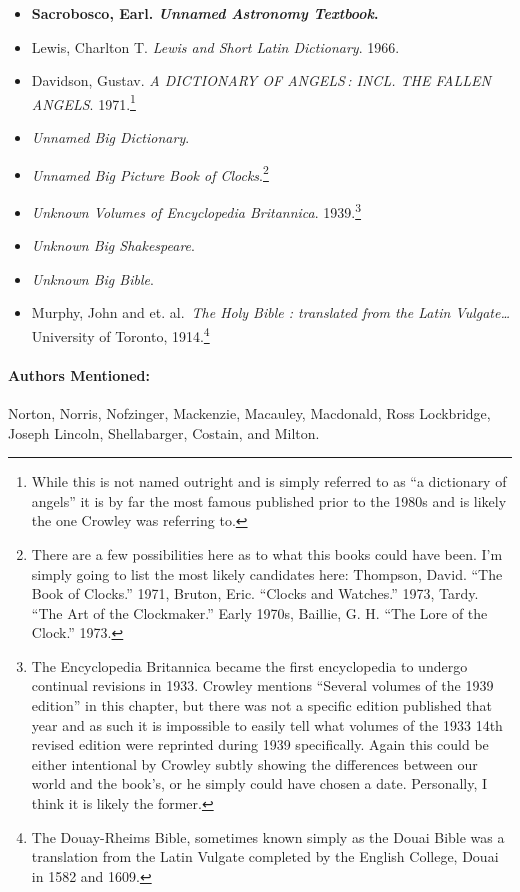 \documentclass[12pt]{article}
\begin{document}
\begin{itemize}
\item
  \textbf{Sacrobosco, Earl. \emph{Unnamed Astronomy Textbook}.}
\item
  Lewis, Charlton T. \emph{Lewis and Short Latin Dictionary}. 1966.
\item
  Davidson, Gustav. \emph{A DICTIONARY OF ANGELS\,: INCL. THE FALLEN ANGELS}. 1971.\footnote{While this is not named outright and is simply referred to as ``a dictionary of angels'' it is by far the most famous published prior to the 1980s and is likely the one Crowley was referring to.}
\item
  \emph{Unnamed Big Dictionary}.
\item
  \emph{Unnamed Big Picture Book of Clocks}.\footnote{There are a few possibilities here as to what this books could have been. I'm simply going to list the most likely candidates here: Thompson, David. ``The Book of Clocks.'' 1971, Bruton, Eric. ``Clocks and Watches.'' 1973, Tardy. ``The Art of the Clockmaker.'' Early 1970s, Baillie, G. H. ``The Lore of the Clock.'' 1973.}
\item
  \emph{Unknown Volumes of Encyclopedia Britannica}. 1939.\footnote{The Encyclopedia Britannica became the first encyclopedia to undergo continual revisions in 1933. Crowley mentions ``Several volumes of the 1939 edition'' in this chapter, but there was not a specific edition published that year and as such it is impossible to easily tell what volumes of the 1933 14th revised edition were reprinted during 1939 specifically. Again this could be either intentional by Crowley subtly showing the differences between our world and the book's, or he simply could have chosen a date. Personally, I think it is likely the former.}
\item
  \emph{Unknown Big Shakespeare}.
\item
  \emph{Unknown Big Bible}.
\item
  Murphy, John and et. al.~\emph{The Holy Bible : translated from the Latin Vulgate\ldots{}} University of Toronto, 1914.\footnote{The Douay-Rheims Bible, sometimes known simply as the Douai Bible was a translation from the Latin Vulgate completed by the English College, Douai in 1582 and 1609.}
\end{itemize}

\paragraph{Authors Mentioned:}\label{authors-mentioned-12}

Norton, Norris, Nofzinger, Mackenzie, Macauley, Macdonald, Ross Lockbridge, Joseph Lincoln, Shellabarger, Costain,  and Milton.
\end{document}
